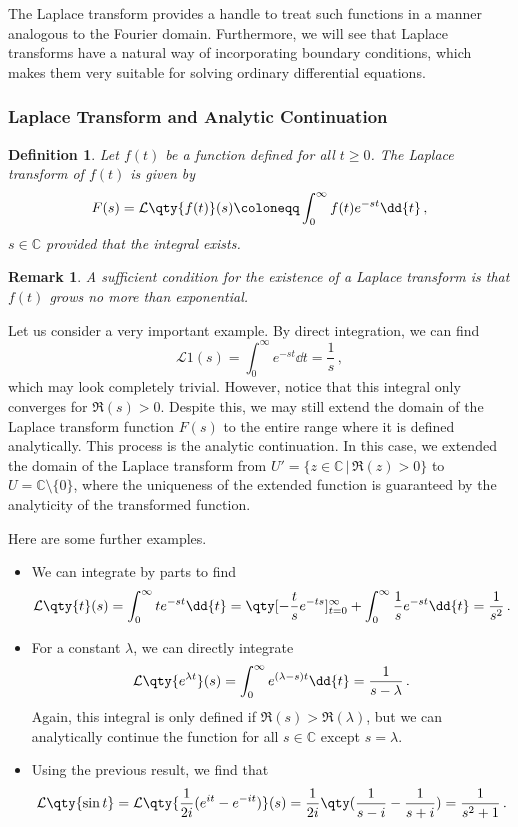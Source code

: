 \documentclass{article}
\theoremstyle{plain}\theoremheaderfont{\normalfont\itshape}\theorembodyfont{\rmfamily}\theoremseparator{.}\newtheorem*{rem}{Remark}\newtheorem*{ex}{Example}\newtheorem*{proof}{Proof}\newtheorem*{altp}{Alternative proof}
\theoremstyle{plain}\theoremheaderfont{\normalfont\bfseries}\theorembodyfont{\rmfamily}\theoremseparator{.}\newtheorem{thm}{Theorem}[section]\newtheorem{lem}[thm]{Lemma}\newtheorem{prop}[thm]{Proposition}\newtheorem*{cor}{Corollary}\newtheorem{defn}[thm]{Definition}\newtheorem{clm}[thm]{Claim}\newtheorem{clminproof}{Claim}
\theoremstyle{break}\theoremheaderfont{\normalfont\itshape}\theorembodyfont{\rmfamily}\theoremseparator{.\medskip}\newtheorem*{proofskip}{Proof}\newtheorem*{exs}{Examples}\newtheorem*{rems}{Remarks}
\theoremstyle{break}\theoremheaderfont{\normalfont\bfseries}\theorembodyfont{\rmfamily}\theoremseparator{.\medskip}\newtheorem{lemskip}[thm]{Lemma}\newtheorem{defnskip}[thm]{Definition}\newtheorem{propskip}[thm]{Proposition}\newtheorem{thmskip}[thm]{Theorem}
\numberwithin{equation}{section}
\newcommand{\lt}[1]{\mathcal{L}\qty{ #1 }}
\begin{document}
	The Laplace transform provides a handle to treat such functions in a manner analogous to the Fourier domain. Furthermore, we will see that Laplace transforms have a natural way of incorporating boundary conditions, which makes them very suitable for solving ordinary differential equations.

	\subsubsection{Laplace Transform and Analytic Continuation}
	\begin{defn}
		Let \(f(t)\) be a function defined for all \(t\ge 0\). The \textit{Laplace transform} of \(f(t)\) is given by
		\[F(s)=\lt{f(t)}(s)\coloneqq\int_{0}^{\infty}f(t)e^{-st}\dd{t}\,,\]
		\(s\in\mathbb{C}\) provided that the integral exists.
	\end{defn}
	\begin{rem}
		A sufficient condition for the existence of a Laplace transform is that \(f(t)\) grows no more than exponential.
	\end{rem}

	Let us consider a very important example. By direct integration, we can find
	\[\lt{1}(s)=\int_{0}^{\infty}e^{-st}\dd{t}=\frac{1}{s}\,,\]
	which may look completely trivial. However, notice that this integral only converges for \(\Re(s)>0\). Despite this, we may still extend the domain of the Laplace transform function \(F(s)\) to the entire range where it is defined analytically. This process is the analytic continuation. In this case, we extended the domain of the Laplace transform from \(U'=\{z\in\mathbb{C}\,|\,\Re(z)>0\}\) to \(U=\mathbb{C}\setminus\{0\}\), where the uniqueness of the extended function is guaranteed by the analyticity of the transformed function.

	Here are some further examples.
	\begin{itemize}[topsep=0pt]
		\item We can integrate by parts to find
		\[\lt{t}(s)=\int_{0}^{\infty}te^{-st}\dd{t}=\qty[-\frac{t}{s}e^{-ts}]_{t=0}^{\infty}+\int_{0}^{\infty}\frac{1}{s}e^{-st}\dd{t}=\frac{1}{s^2}\,.\]
		\item For a constant \(\lambda\), we can directly integrate
		\[\lt{e^{\lambda t}}(s)=\int_{0}^{\infty}e^{(\lambda-s)t}\dd{t}=\frac{1}{s-\lambda}\,.\]
		Again, this integral is only defined if \(\Re(s)>\Re(\lambda)\), but we can analytically continue the function for all \(s\in\mathbb{C}\) except \(s=\lambda\).
		\item Using the previous result, we find that
		\[\lt{\sin t}=\lt{\frac{1}{2i}(e^{it}-e^{-it})}(s)=\frac{1}{2i}\qty(\frac{1}{s-i}-\frac{1}{s+i})=\frac{1}{s^2+1}\,.\]
	\end{itemize}
\end{document}
